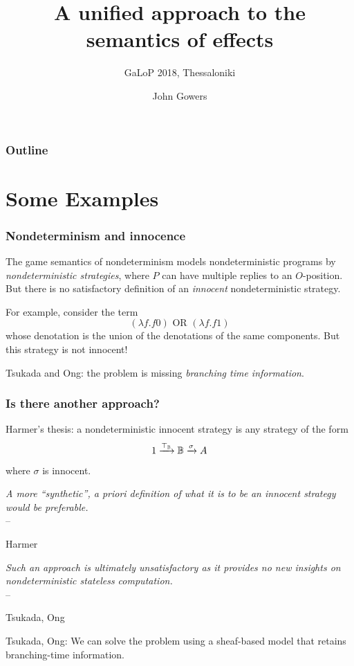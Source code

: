 \documentclass{beamer}
\title{A unified approach to the semantics of effects}
\subtitle{GaLoP 2018, Thessaloniki}
\author{John Gowers}
\newcommand{\sign}[1]{\\\hfill -- \parbox[t]{.3\textwidth}{#1}}
\begin{document}
\begin{frame}
  \titlepage
\end{frame}

\begin{frame}
  \frametitle{Outline}
  \tableofcontents
\end{frame}

\section{Some Examples}

\renewcommand*{\arraystretch}{0.5}


\begin{frame}
  \frametitle{Nondeterminism and innocence}

  The game semantics of nondeterminism models nondeterministic programs by \emph{nondeterministic strategies}, where $P$ can have multiple replies to an $O$-position. But there is no satisfactory definition of an \emph{innocent} nondeterministic strategy.
  \pause

  For example, consider the term
  \[
    (\lambda f.f 0) \text{ OR } (\lambda f.f 1)
    \]
  whose denotation is the union of the denotations of the same components.  
  But this strategy is not innocent!
  \pause

  Tsukada and Ong: the problem is missing \emph{branching time information}.
\end{frame}

\begin{frame}
  \frametitle{Is there another approach?}

  Harmer's thesis: a nondeterministic innocent strategy is any strategy of the form
  \[
    1 \xrightarrow{\top_{\mathbb{B}}}
    \mathbb{B} \xrightarrow{\sigma}
    A
    \]
  where $\sigma$ is innocent.
  \pause

  \textit{A more “synthetic”, a priori definition
of what it is to be an innocent strategy would be preferable.}
  \sign{Harmer}
  \pause

  \textit{Such
an approach is ultimately unsatisfactory as it provides no new
  insights on nondeterministic stateless computation.}
  \sign{Tsukada, Ong}
  \pause

\pause

  Tsukada, Ong: We can solve the problem using a sheaf-based model that retains branching-time information.
  \pause

\end{frame}
\end{document}
